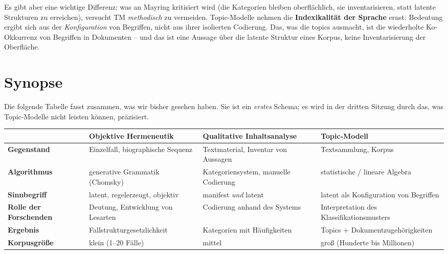 \documentclass[a4paper,11pt]{article}
\begin{document}
Es gibt aber eine wichtige Differenz: was an Mayring kritisiert wird
(die Kategorien bleiben oberflächlich, sie inventarisieren, statt
latente Strukturen zu erreichen), versucht TM \emph{methodisch} zu
vermeiden. Topic-Modelle nehmen die \textbf{Indexikalität der Sprache}
ernst: Bedeutung ergibt sich aus der \emph{Konfiguration} von
Begriffen, nicht aus ihrer isolierten Codierung. Das, was die topics
ausmacht, ist die wiederholte Ko-Okkurrenz von Begriffen in
Dokumenten -- und das ist eine Aussage über die latente Struktur eines
Korpus, keine Inventarisierung der Oberfläche.

\section{Synopse}

Die folgende Tabelle fasst zusammen, was wir bisher gesehen haben.
Sie ist ein \emph{erstes} Schema; es wird in der dritten Sitzung
durch das, was Topic-Modelle nicht leisten können, präzisiert.

\smallskip

\begin{tabularx}{\textwidth}{@{}p{}XXX@{}}
\toprule
& \textbf{Objektive Hermeneutik} & \textbf{Qualitative Inhaltsanalyse} & \textbf{Topic-Modell} \\
\midrule
\textbf{Gegenstand}
  & Einzelfall, biographische Sequenz
  & Textmaterial, Inventar von Aussagen
  & Textsammlung, Korpus \\
\addlinespace[3pt]
\textbf{Algorithmus}
  & generative Grammatik (Chomsky)
  & Kategoriensystem, manuelle Codierung
  & statistische / lineare Algebra \\
\addlinespace[3pt]
\textbf{Sinnbegriff}
  & latent, regelerzeugt, objektiv
  & manifest \emph{und} latent
  & latent als Konfiguration von Begriffen \\
\addlinespace[3pt]
\textbf{Rolle der Forschenden}
  & Deutung, Entwicklung von Lesarten
  & Codierung anhand des Systems
  & Interpretation des Klassifikationsmusters \\
\addlinespace[3pt]
\textbf{Ergebnis}
  & Fallstrukturgesetzlichkeit
  & Kategorien mit Häufigkeiten
  & Topics + Dokument\-zugehörigkeiten \\
\addlinespace[3pt]
\textbf{Korpusgröße}
  & klein (1--20 Fälle)
  & mittel
  & groß (Hunderte bis Millionen) \\
\bottomrule
\end{tabularx}
\end{document}

